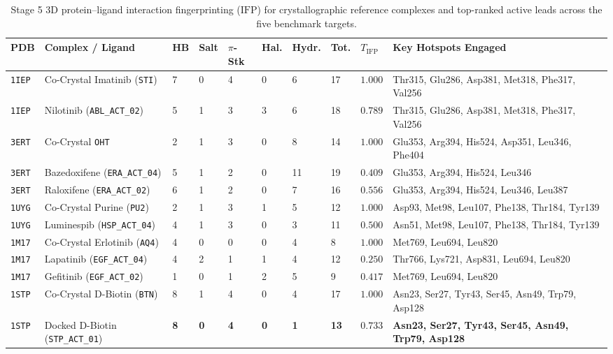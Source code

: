 \documentclass[11pt,a4paper]{article}
\begin{document}
\begin{table}[!htbp]
\centering
\caption{Stage 5 3D protein--ligand interaction fingerprinting ($\text{IFP}$) for crystallographic reference complexes and top-ranked active leads across the five benchmark targets.}
\label{tab:stage5}
\vspace{2pt}
{\footnotesize
\renewcommand{\arraystretch}{1.20}
\begin{tabularx}{\textwidth}{L{0.85cm} L{2.65cm} C{0.65cm} C{0.65cm} C{0.75cm} C{0.65cm} C{0.75cm} C{0.75cm} C{0.9cm} Y}
\toprule
{}
\textbf{PDB} & \textbf{Complex / Ligand} & \textbf{HB} & \textbf{Salt} & \textbf{$\pi$-Stk} & \textbf{Hal.} & \textbf{Hydr.} & \textbf{Tot.} & \textbf{$T_{\text{IFP}}$} & \textbf{Key Hotspots Engaged} \\
\midrule
\texttt{1IEP} & Co-Crystal Imatinib (\texttt{STI}) & 7 & 0 & 4 & 0 & 6 & 17 & $1.000$ & Thr315, Glu286, Asp381, Met318, Phe317, Val256 \\
\texttt{1IEP} & Nilotinib (\texttt{ABL\_ACT\_02}) & 5 & 1 & 3 & 3 & 6 & 18 & $0.789$ & Thr315, Glu286, Asp381, Met318, Phe317, Val256 \\
\texttt{3ERT} & Co-Crystal \texttt{OHT} & 2 & 1 & 3 & 0 & 8 & 14 & $1.000$ & Glu353, Arg394, His524, Asp351, Leu346, Phe404 \\
\texttt{3ERT} & Bazedoxifene (\texttt{ERA\_ACT\_04}) & 5 & 1 & 2 & 0 & 11 & 19 & $0.409$ & Glu353, Arg394, His524, Leu346 \\
\texttt{3ERT} & Raloxifene (\texttt{ERA\_ACT\_02}) & 6 & 1 & 2 & 0 & 7 & 16 & $0.556$ & Glu353, Arg394, His524, Leu346, Leu387 \\
\texttt{1UYG} & Co-Crystal Purine (\texttt{PU2}) & 2 & 1 & 3 & 1 & 5 & 12 & $1.000$ & Asp93, Met98, Leu107, Phe138, Thr184, Tyr139 \\
\texttt{1UYG} & Luminespib (\texttt{HSP\_ACT\_04}) & 4 & 1 & 3 & 0 & 3 & 11 & $0.500$ & Asn51, Met98, Leu107, Phe138, Thr184, Tyr139 \\
\texttt{1M17} & Co-Crystal Erlotinib (\texttt{AQ4}) & 4 & 0 & 0 & 0 & 4 & 8 & $1.000$ & Met769, Leu694, Leu820 \\
\texttt{1M17} & Lapatinib (\texttt{EGF\_ACT\_04}) & 4 & 2 & 1 & 1 & 4 & 12 & $0.250$ & Thr766, Lys721, Asp831, Leu694, Leu820 \\
\texttt{1M17} & Gefitinib (\texttt{EGF\_ACT\_02}) & 1 & 0 & 1 & 2 & 5 & 9 & $0.417$ & Met769, Leu694, Leu820 \\
\texttt{1STP} & Co-Crystal D-Biotin (\texttt{BTN}) & 8 & 1 & 4 & 0 & 4 & 17 & $1.000$ & Asn23, Ser27, Tyr43, Ser45, Asn49, Trp79, Asp128 \\
\texttt{1STP} & Docked D-Biotin (\texttt{STP\_ACT\_01}) & \textbf{8} & \textbf{0} & \textbf{4} & \textbf{0} & \textbf{1} & \textbf{13} & $\mathbf{0.733}$ & \textbf{Asn23, Ser27, Tyr43, Ser45, Asn49, Trp79, Asp128} \\
\bottomrule
\end{tabularx}
}
\end{table}
\end{document}
